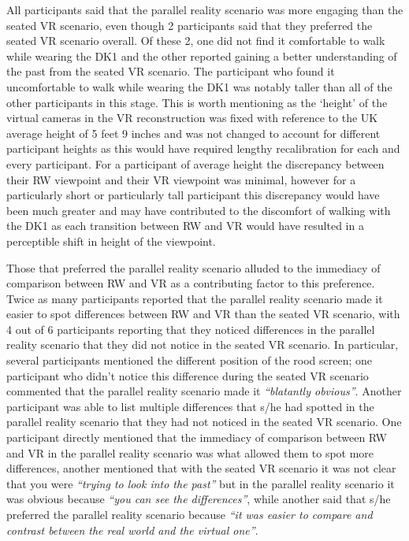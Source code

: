 All participants said that the parallel reality scenario was more engaging than the seated VR scenario, even though 2 participants said that they preferred the seated VR scenario overall. Of these 2,  one did not find it comfortable to walk while wearing the DK1 and the other reported gaining a better understanding of the past from the seated VR scenario. The participant who found it uncomfortable to walk while wearing the DK1 was notably taller than all of the other participants in this stage. This is worth mentioning as the `height' of the virtual cameras in the VR reconstruction was fixed with reference to the UK average height of 5 feet 9 inches and was not changed to account for different participant heights as this would have required lengthy recalibration for each and every participant. For a participant of average height the discrepancy between their RW viewpoint and their VR viewpoint was minimal, however for a particularly short or particularly tall participant this discrepancy would have been much greater and may have contributed to the discomfort of walking with the DK1 as each transition between RW and VR would have resulted in a perceptible shift in height of the viewpoint.

Those that preferred the parallel reality scenario alluded to the immediacy of comparison between RW and VR as a contributing factor to this preference. Twice as many participants reported that the parallel reality scenario made it easier to spot differences between RW and VR than the seated VR scenario, with 4 out of 6 participants reporting that they noticed differences in the parallel reality scenario that they did not notice in the seated VR scenario. In particular, several participants mentioned the different position of the rood screen; one participant who didn't notice this difference during the seated VR scenario commented that the parallel reality scenario made it \textit{``blatantly obvious''}. Another participant was able to list multiple differences that s/he had spotted in the parallel reality scenario that they had not noticed in the seated VR scenario. One participant directly mentioned that the immediacy of comparison between RW and VR in the parallel reality scenario was what allowed them to spot more differences, another mentioned that with the seated VR scenario it was not clear that you were \textit{``trying to look into the past''} but in the parallel reality scenario it was obvious because \textit{``you can see the differences''}, while another said that s/he preferred the parallel reality scenario because \textit{``it was easier to compare and contrast between the real world and the virtual one''}.


